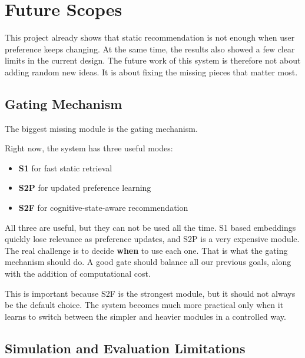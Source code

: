 \section{Future Scopes}

This project already shows that static recommendation is not enough when user preference keeps changing. 
At the same time, the results also showed a few clear limits in the current design. 
The future work of this system is therefore not about adding random new ideas. 
It is about fixing the missing pieces that matter most.




\subsection{Gating Mechanism}

The biggest missing module is the gating mechanism.

Right now, the system has three useful modes:

\begin{itemize}
    \item \textbf{S1} for fast static retrieval
    \item \textbf{S2P} for updated preference learning
    \item \textbf{S2F} for cognitive-state-aware recommendation
\end{itemize}

All three are useful, but they can not be used all the time. 
S1 based embeddings quickly lose relevance as preference updates, and S2P is a very expensive module. 
The real challenge is to decide \textbf{when} to use each one. 
That is what the gating mechanism should do.
A good gate should balance all our previous goals, along with the addition of computational cost.

This is important because S2F is the strongest module, but it should not always be the default choice. 
The system becomes much more practical only when it learns to switch between the simpler and heavier modules in a controlled way.



\subsection{Simulation and Evaluation Limitations}


